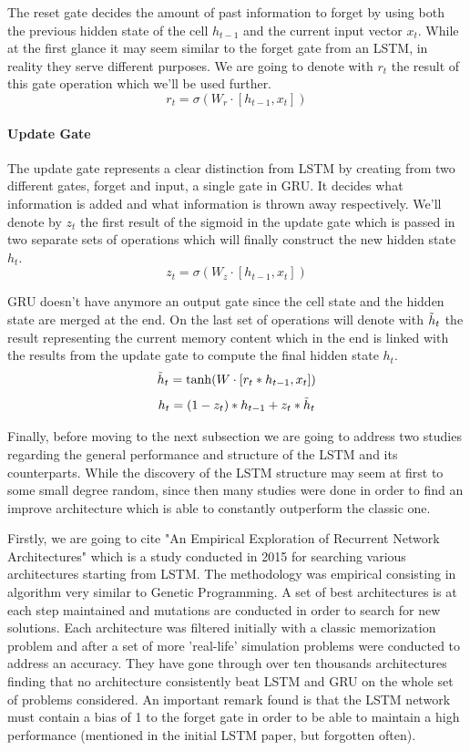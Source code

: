 The reset gate decides the amount of past information to forget by using both the previous hidden state of the cell $\displaystyle h_{t-1}$ and the current input vector $\displaystyle x_t$. While at the first glance it may seem similar to the forget gate from an LSTM, in reality they serve different purposes. We are going to denote with $\displaystyle r_t$ the result of this gate operation which we'll be used further.
\[ r_t = \sigma(W_r\cdot[h_{t-1}, x_t])\]


\paragraph{Update Gate}\mbox{}

The update gate represents a clear distinction from LSTM by creating from two different gates, forget and input, a single gate in GRU. It decides what information is added and what information is thrown away respectively. We'll denote by $\displaystyle z_t$ the first result of the sigmoid in the update gate which is passed in two separate sets of operations which will finally construct the new hidden state $\displaystyle h_t$.
\[ z_t = \sigma(W_z\cdot[h_{t-1}, x_t])\]

GRU doesn't have anymore an output gate since the cell state and the hidden state are merged at the end. On the last set of operations will denote with $\displaystyle \Tilde{h}_t$ the result representing the current memory content which in the end is linked with the results from the update gate to compute the final hidden state $\displaystyle h_t$.
\[ \Tilde{h}_t = \tanh(W\cdot [r_t * h_{t-1}, x_t]) \]
\[ h_t = (1 - z_t) * h_{t-1} + z_t * \Tilde{h}_t\]

Finally, before moving to the next subsection we are going to address two studies regarding the general performance and structure of the LSTM and its counterparts. While the discovery of the LSTM structure may seem at first to some small degree random, since then many studies were done in order to find an improve architecture which is able to constantly outperform the classic one.

Firstly, we are going to cite "An Empirical Exploration of Recurrent Network Architectures" \cite{jozefowicz2015empirical} which is a study conducted in 2015 for searching various architectures starting from LSTM. The methodology was empirical consisting in algorithm very similar to Genetic Programming. A set of best architectures is at each step maintained and mutations are conducted in order to search for new solutions. Each architecture was filtered initially with a classic memorization problem and after a set of more 'real-life' simulation problems were conducted to address an accuracy. They have gone through over ten thousands architectures finding that no architecture consistently beat LSTM and GRU on the whole set of problems considered. An important remark found is that the LSTM network must contain a bias of 1 to the forget gate in order to be able to maintain a high performance (mentioned in the initial LSTM paper, but forgotten often).

